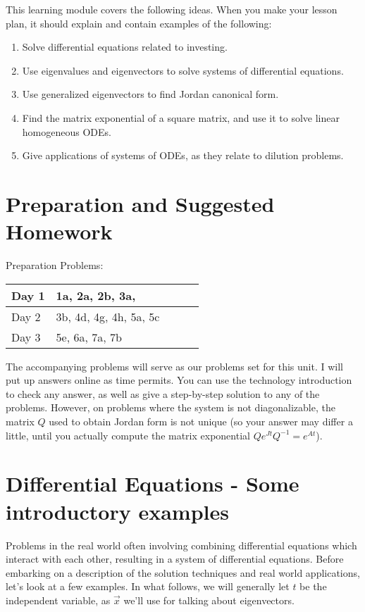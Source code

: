 \documentclass[10pt]{article}
\theoremstyle{plain}
\theoremstyle{box}
\newcommand{\mytitle}{Jordan Form}
\begin{document}
\noindent{\huge{\bf \mytitle}}

\noindent
This learning module covers the following ideas.  When you make your lesson plan, it should explain and contain examples of the following:
\begin{enumerate}

\item Solve differential equations related to investing.
\item Use eigenvalues and eigenvectors to solve systems of differential equations.
\item Use generalized eigenvectors to find Jordan canonical form.
\item Find the matrix exponential of a square matrix, and use it to solve linear homogeneous ODEs. 
\item Give applications of systems of ODEs, as they relate to dilution problems. 



\end{enumerate}


\section{Preparation and Suggested Homework}

Preparation Problems:
\begin{center}
\begin{tabular}{|l|llll|}\hline
Day 1& 1a, 2a, 2b, 3a,
\\\hline
Day 2& 3b, 4d, 4g, 4h, 5a, 5c
\\\hline
Day 3& 5e, 6a, 7a, 7b
\\\hline
\end{tabular}
\end{center}



The accompanying problems will serve as our problems set for this unit.  I will put up answers online as time permits.  You can use the technology introduction to check any answer, as well as give a step-by-step solution to any of the problems. However, on problems where the system is not diagonalizable, the matrix $Q$ used to obtain Jordan form is not unique (so your answer may differ a little, until you actually compute the matrix exponential $Qe^{Jt}Q^{-1}=e^{At}$).



\section{Differential Equations - Some introductory examples}
Problems in the real world often involving combining differential equations which interact with each other, resulting in a system of differential equations. Before embarking on a description of the solution techniques and real world applications, let's look at a few examples. In what follows, we will generally let $t$ be the independent variable, as $\vec x$ we'll use for talking about eigenvectors. 
\end{document}
